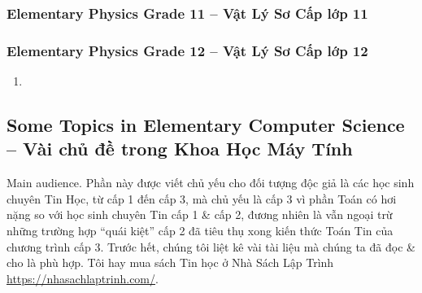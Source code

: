 \documentclass[12pt,twoside]{book}
\begin{document}
\subsubsection{Elementary Physics Grade 11 -- Vật Lý Sơ Cấp lớp 11}

\subsubsection{Elementary Physics Grade 12 -- Vật Lý Sơ Cấp lớp 12}

\begin{enumerate}
	\item 
\end{enumerate}


\subsection{Some Topics in Elementary Computer Science -- Vài chủ đề trong Khoa Học Máy Tính}
\label{sect: eCS}
{\sf Main audience.} Phần này được viết chủ yếu cho đối tượng độc giả là các học sinh chuyên Tin Học, từ cấp 1 đến cấp 3, mà chủ yếu là cấp 3 vì phần Toán có hơi nặng so với học sinh chuyên Tin cấp 1 \& cấp 2, đương nhiên là vẫn ngoại trừ những trường hợp ``quái kiệt'' cấp 2 đã tiêu thụ xong kiến thức Toán Tin của chương trình cấp 3. Trước hết, chúng tôi liệt kê vài tài liệu mà chúng ta đã đọc \& cho là phù hợp. Tôi hay mua sách Tin học ở Nhà Sách Lập Trình \url{https://nhasachlaptrinh.com/}.
\end{document}
